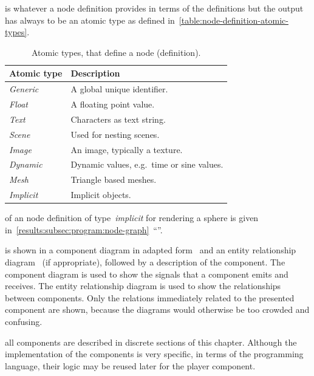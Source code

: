 \documentclass[%
    a4paper,    %
    justified,  %
    nobib,      %
    openany     %
]{tufte-book}
\makeatletter
\renewcommand{\label}[1]{\@tufte@label{##1}}%
\newcommand{\ra}[1]{\renewcommand{\arraystretch}{#1}}
\makeatother
\begin{document}
 is whatever a node definition provides in terms of the
definitions but the output has always to be an atomic type as defined
in~\cref{table:node-definition-atomic-types}.

\begin{table}[!htbp]\centering
  \ra{1.3}
  \begin{tabularx}{\textwidth}{@{}lX@{}}
    \toprule
    \textbf{Atomic type} & \textbf{Description}                       \\
    \midrule
    \textit{Generic}     & A global unique identifier.                \\
    \textit{Float}       & A floating point value.                    \\
    \textit{Text}        & Characters as text string.                 \\
    \textit{Scene}       & Used for nesting scenes.                   \\
    \textit{Image}       & An image, typically a texture.             \\
    \textit{Dynamic}     & Dynamic values, e.g.\ time or sine values. \\
    \textit{Mesh}        & Triangle based meshes.                     \\
    \textit{Implicit}    & Implicit objects.                          \\
    \bottomrule
  \end{tabularx}
  \caption{Atomic types, that define a node (definition).}
\label{table:node-definition-atomic-types}
\end{table}

 of an node definition of type~\emph{implicit} for
rendering a sphere is given
in~\autoref{results:subsec:program:node-graph}~\enquote{}.

 is shown in a component
diagram in adapted form~\cite[pp. 653 -- 654]{larman-applying-2004} and an
entity relationship diagram~\cite[pp. 501 ff.]{larman-applying-2004} (if
appropriate), followed by a description of the component. The component diagram
is used to show the signals that a component emits and receives. The entity
relationship diagram is used to show the relationships between components. Only
the relations immediately related to the presented component are shown, because
the diagrams would otherwise be too crowded and confusing.

 all components are described in discrete
sections of this chapter. Although the implementation of the components is very
specific, in terms of the programming language, their logic may be reused later
for the player component.
\end{document}
